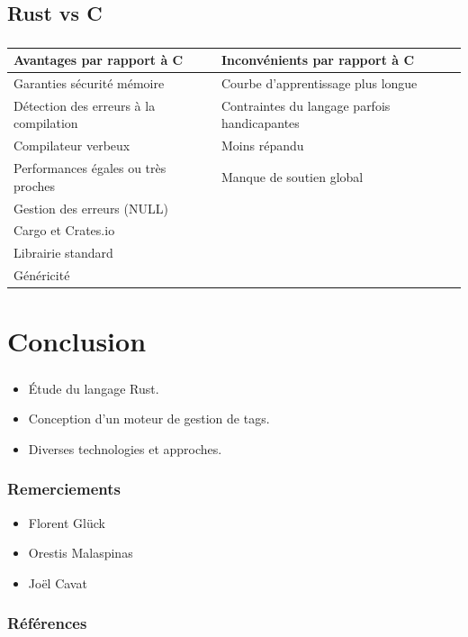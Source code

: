 \documentclass[10pt]{beamer}
\begin{document}
\subsection{Rust vs C}
\begin{frame}
    \frametitle{\subsecname}
    \begin{center}
        \begin{tabularx}{11cm}{|X|X|} \hline
            \textbf{Avantages par rapport à C} & \textbf{Inconvénients par rapport à C} \\ \hline
            Garanties sécurité mémoire & Courbe d'apprentissage plus longue \\ \hline
            Détection des erreurs à la compilation & Contraintes du langage parfois handicapantes \\ \hline
            Compilateur verbeux & Moins répandu \\ \hline
            Performances égales ou très proches & Manque de soutien global \\ \hline
            Gestion des erreurs (NULL) &  \\ \hline
            Cargo et Crates.io &  \\ \hline
            Librairie standard &  \\ \hline
            Généricité &  \\ \hline
        \end{tabularx}
    \end{center}
\end{frame}

\section{Conclusion}
\begin{frame}
    \frametitle{\secname}
    \begin{itemize}
        \pause
        \item Étude du langage Rust.
        \pause
        \item Conception d'un moteur de gestion de tags.
        \pause
        \item Diverses technologies et approches.
    \end{itemize}
\end{frame}

\begin{frame}
    \frametitle{Remerciements}
    \begin{itemize}
        \item Florent Glück
        \item Orestis Malaspinas
        \item Joël Cavat
    \end{itemize}
\end{frame}

\begin{frame}[allowframebreaks]
    \frametitle{Références}
    \fontsize{6pt}{6}\selectfont
	
	
\end{frame}
\end{document}
